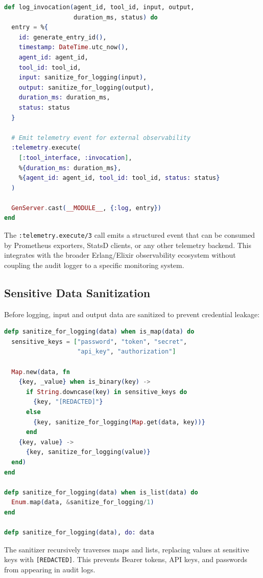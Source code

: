 \documentclass[12pt,a4paper]{article}
\theoremstyle{plain}
\theoremstyle{definition}
\begin{document}
\begin{lstlisting}[language=elixir, caption={Audit logging with telemetry integration.}, label={lst:audit-log}]
def log_invocation(agent_id, tool_id, input, output,
                   duration_ms, status) do
  entry = %{
    id: generate_entry_id(),
    timestamp: DateTime.utc_now(),
    agent_id: agent_id,
    tool_id: tool_id,
    input: sanitize_for_logging(input),
    output: sanitize_for_logging(output),
    duration_ms: duration_ms,
    status: status
  }

  # Emit telemetry event for external observability
  :telemetry.execute(
    [:tool_interface, :invocation],
    %{duration_ms: duration_ms},
    %{agent_id: agent_id, tool_id: tool_id, status: status}
  )

  GenServer.cast(__MODULE__, {:log, entry})
end
\end{lstlisting}

The \texttt{:telemetry.execute/3} call emits a structured event that can be consumed by Prometheus exporters, StatsD clients, or any other telemetry backend. This integrates with the broader Erlang/Elixir observability ecosystem without coupling the audit logger to a specific monitoring system.

\subsection{Sensitive Data Sanitization}

Before logging, input and output data are sanitized to prevent credential leakage:

\begin{lstlisting}[language=elixir, caption={Recursive sensitive data sanitization.}, label={lst:sanitize}]
defp sanitize_for_logging(data) when is_map(data) do
  sensitive_keys = ["password", "token", "secret",
                    "api_key", "authorization"]

  Map.new(data, fn
    {key, _value} when is_binary(key) ->
      if String.downcase(key) in sensitive_keys do
        {key, "[REDACTED]"}
      else
        {key, sanitize_for_logging(Map.get(data, key))}
      end
    {key, value} ->
      {key, sanitize_for_logging(value)}
  end)
end

defp sanitize_for_logging(data) when is_list(data) do
  Enum.map(data, &sanitize_for_logging/1)
end

defp sanitize_for_logging(data), do: data
\end{lstlisting}

The sanitizer recursively traverses maps and lists, replacing values at sensitive keys with \texttt{[REDACTED]}. This prevents Bearer tokens, API keys, and passwords from appearing in audit logs.
\end{document}
